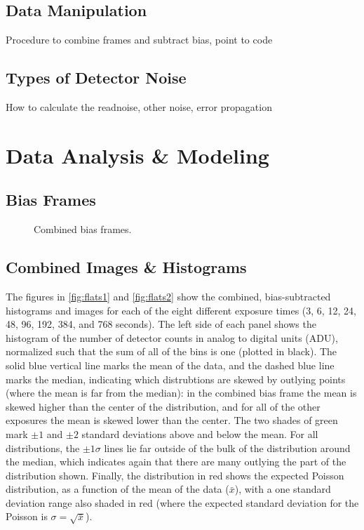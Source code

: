 \documentclass[preprint]{aastex62}
\begin{document}
\subsection{Data Manipulation}
Procedure to combine frames and subtract bias, point to code

\subsection{Types of Detector Noise}
How to calculate the readnoise, other noise, error propagation

\section{Data Analysis \& Modeling}
\subsection{Bias Frames}

\begin{figure}[ht]
\caption{Combined bias frames.} \label{fig:bias}
\end{figure}

\subsection{Combined Images \& Histograms}
The figures in \ref{fig:flats1} and \ref{fig:flats2} show the combined, bias-subtracted histograms and images for each of the eight different exposure times (3, 6, 12, 24, 48, 96, 192, 384, and 768 seconds). The left side of each panel shows the histogram of the number of detector counts in analog to digital units (ADU), normalized such that the sum of all of the bins is one (plotted in black). The solid blue vertical line marks the mean of the data, and the dashed blue line marks the median, indicating which distrubtions are skewed by outlying points (where the mean is far from the median): in the combined bias frame the mean is skewed higher than the center of the distribution, and for all of the other exposures the mean is skewed lower than the center. The two shades of green mark $\pm1$ and $\pm2$ standard deviations above and below the mean. For all distributions, the $\pm1\sigma$ lines lie far outside of the bulk of the distribution around the median, which indicates again that there are many outlying the part of the distribution shown. Finally, the distribution in red shows the expected Poisson distribution, as a function of the mean of the data ($\bar{x}$), with a one standard deviation range also shaded in red (where the expected standard deviation for the Poisson is $\sigma=\sqrt{\bar{x}}$).  
\end{document}
